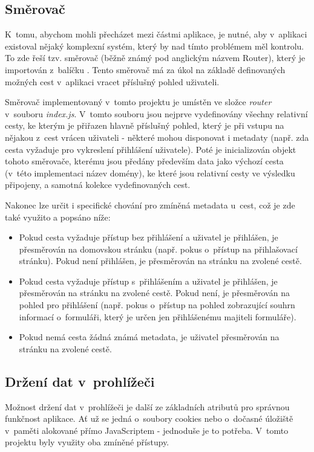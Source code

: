 	\subsection{Směrovač}\label{sec:fe_router} %
	K~tomu, abychom mohli přecházet mezi částmi aplikace, je nutné, aby v~aplikaci existoval nějaký komplexní systém, který by nad tímto problémem měl kontrolu. To zde řeší tzv. směrovač (běžně známý pod anglickým názvem Router), který je importován z~balíčku . Tento směrovač má za úkol na základě definovaných možných cest v~aplikaci vracet příslušný pohled uživateli.
	
	Směrovač implementovaný v~tomto projektu je umístěn ve složce \textit{router} v~souboru \textit{index.js}. V~tomto souboru jsou nejprve vydefinovány všechny relativní cesty, ke kterým je přiřazen hlavně příslušný pohled, který je při vstupu na nějakou z~cest vrácen uživateli - některé mohou disponovat i metadaty (např. zda cesta vyžaduje pro vykreslení přihlášení uživatele). Poté je inicializován objekt tohoto směrovače, kterému jsou předány především data jako výchozí cesta (v~této implementaci název domény), ke které jsou relativní cesty ve výsledku připojeny, a samotná kolekce vydefinovaných cest. 
	
	Nakonec lze určit i specifické chování pro zmíněná metadata u~cest, což je zde také využito a popsáno níže:
	\begin{itemize}
		\item Pokud cesta vyžaduje přístup bez přihlášení a uživatel je přihlášen, je přesměrován na domovskou stránku (např. pokus o~přístup na přihlašovací stránku). Pokud není přihlášen, je přesměrován na stránku na zvolené cestě.
		\item Pokud cesta vyžaduje přístup s~přihlášením a uživatel je přihlášen, je přesměrován na stránku na zvolené cestě. Pokud není, je přesměrován na pohled pro přihlášení (např. pokus o~přístup na pohled zobrazující souhrn informací o~formuláři, který je určen jen přihlášenému majiteli formuláře).
		\item Pokud nemá cesta žádná známá metadata, je uživatel přesměrován na stránku na zvolené cestě.
	\end{itemize}

	\subsection{Držení dat v~prohlížeči} %
	Možnost držení dat v~prohlížeči je další ze základních atributů pro správnou funkčnost aplikace. Ať už se jedná o~soubory cookies nebo o~dočasné úložiště v~paměti alokované přímo JavaScriptem - jednoduše je to potřeba. V~tomto projektu byly využity oba zmíněné přístupy.
	
